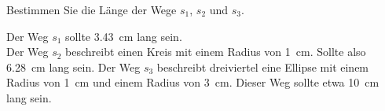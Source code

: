 
\begin{aufgabe}
	Bestimmen Sie die Länge der Wege $s_1$, $s_2$ und $s_3$.

\begin{center}
\end{center}

\begin{loesung}
	Der Weg $s_1$ sollte \SI{3.43}{cm} lang sein.\\
	Der Weg $s_2$ beschreibt einen Kreis mit einem Radius von \SI{1}{cm}. Sollte also \SI{6.28}{cm} lang sein.
	Der Weg $s_3$ beschreibt dreiviertel eine Ellipse mit einem Radius von \SI{1}{cm} und einem Radius von \SI{3}{cm}. 
	Dieser Weg sollte etwa \SI{10}{cm} lang sein.
\end{loesung}

\end{aufgabe}

